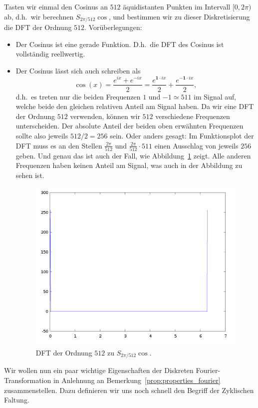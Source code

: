 \begin{example}
Tasten wir einmal den Cosinus an $ 512 $ äquidistanten Punkten im Intervall $ [0, 2\pi) $ ab,
d.h.\ wir berechnen $ S_{2\pi/512}\cos $, und bestimmen wir zu dieser Diskretisierung die DFT der 
Ordnung $ 512 $. Vorüberlegungen:
\begin{itemize}
\item Der Cosinus ist eine gerade Funktion. D.h.\ die DFT des Cosinus ist vollständig
  reellwertig.
\item Der Cosinus lässt sich auch schreiben als
  \[
      \cos(x) 
    = \frac{e^{ix} + e^{-ix}}{2}
    = \frac{e^{\mathbf{1} \cdot ix}}{2} + \frac{e^{\mathbf{-1} \cdot ix}}{2},
  \]
  d.h.\ es treten nur die beiden Frequenzen $ 1 $ und $ -1 \simeq 511 $ im Signal auf, welche beide 
  den gleichen relativen Anteil am Signal haben. Da wir eine DFT der Ordnung $ 512 $ verwenden, 
  können wir $ 512 $ verschiedene Frequenzen unterscheiden. Der absolute Anteil der beiden
  oben erwähnten Frequenzen sollte also jeweils $ 512 / 2 = 256 $ sein. Oder anders gesagt:
  Im Funktionsplot der DFT muss es an den Stellen $ \frac{2\pi}{512} $ und
  $ \frac{2\pi}{512} \cdot 511 $ einen Ausschlag von jeweils $ 256 $ geben. Und genau das ist auch 
  der Fall, wie Abbildung~\ref{fig:dft512_cosine} zeigt. Alle anderen Frequenzen haben keinen 
  Anteil am Signal, was auch in der Abbildung zu sehen ist.
  \begin{figure}
  \centering
  \includegraphics[width=0.5\linewidth]{Bilder/dft512_cosine}
  \caption{DFT der Ordnung $ 512 $ zu $ S_{2\pi/512}\cos $.}
  \label{fig:dft512_cosine}
  \end{figure}
\end{itemize}
\end{example}

Wir wollen nun ein paar wichtige Eigenschaften der Diskreten Fourier-Transformation in Anlehnung
an Bemerkung~\ref{prop:properties_fourier} zusammenstellen. Dazu definieren wir uns noch schnell den
Begriff der Zyklischen Faltung.

